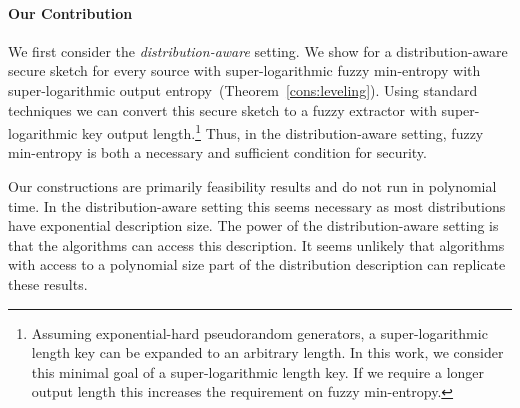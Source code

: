 \documentclass[11pt]{article}
\newcommand{\thref}[1]{\mbox{Theorem~\ref{#1}}}
\begin{document}



\paragraph{Our Contribution} We first consider the \emph{distribution-aware} setting.  We show for a distribution-aware secure sketch for every source with super-logarithmic fuzzy min-entropy with super-logarithmic output entropy~(\thref{cons:leveling}).  Using standard techniques we can convert this secure sketch to a fuzzy extractor with super-logarithmic key output length.\footnote{Assuming exponential-hard pseudorandom generators, a super-logarithmic length key can be expanded to an arbitrary length.  In this work, we consider this minimal goal of a super-logarithmic length key.  If we require a longer output length this increases the requirement on fuzzy min-entropy.}  Thus, in the distribution-aware setting, fuzzy min-entropy is both a necessary and sufficient condition for security.  

Our constructions are primarily feasibility results and do not run in polynomial time.  In the distribution-aware setting this seems necessary as most distributions have exponential description size.  The power of the distribution-aware setting is that the algorithms can access this description.  It seems unlikely that algorithms with access to a polynomial size part of the distribution description can replicate these results.
\end{document}
